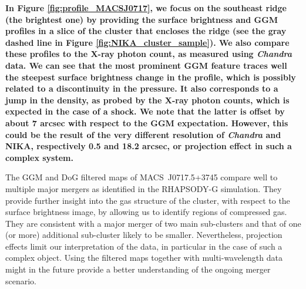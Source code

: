 \documentclass[twocolumn,traditabstract]{aa}
\begin{document}
{\bf In Figure \ref{fig:profile_MACSJ0717}, we focus on the southeast ridge (the brightest one) by providing the surface brightness and GGM profiles in a slice of the cluster that encloses the ridge (see the gray dashed line in Figure \ref{fig:NIKA_cluster_sample}). We also compare these profiles to the X-ray photon count, as measured using \textit{Chandra} data. We can see that the most prominent GGM feature traces well the steepest surface brightness change in the profile, which is possibly related to a discontinuity in the pressure. It also corresponds to a jump in the density, as probed by the X-ray photon counts, which is expected in the case of a shock. We note that the latter is offset by about 7 arcsec with respect to the GGM expectation. However, this could be the result of the very different resolution of \textit{Chandra} and NIKA, respectively 0.5 and 18.2 arcsec, or projection effect in such a complex system.}

The GGM and DoG filtered maps of \mbox{MACS~J0717.5+3745} compare well to multiple major mergers as identified in the RHAPSODY-G simulation. They provide further insight into the gas structure of the cluster, with respect to the surface brightness image, by allowing us to identify regions of compressed gas. They are consistent with a major merger of two main sub-clusters and that of one (or more) additional sub-cluster likely to be smaller. Nevertheless, projection effects limit our interpretation of the data, in particular in the case of such a complex object. Using the filtered maps together with multi-wavelength data might in the future provide a better understanding of the ongoing merger scenario.
\end{document}
